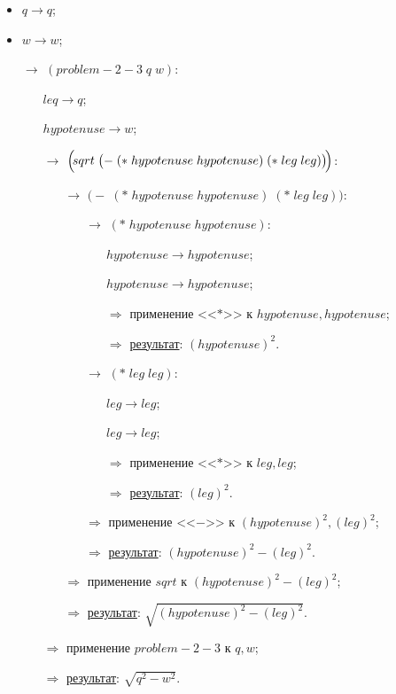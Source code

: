 \begin{itemize}
	\item $q \to q$;
	\item $w \to w$;
	\item[$\longrightarrow$] $(problem\!-\!2\!-\!3\; q\; w)$:
	\begin{itemize}
		\item[\textbullet] $leq \to q$;
		\item[\textbullet] $hypotenuse \to w$;
		\item[$\longrightarrow$] $\Bigl(\!sqrt\; \bigl(-\; (*\; hypotenuse\; hypotenuse)\; (*\; leg\; leg)\bigr)\!\Bigr)$:
		\begin{itemize}
			\item[$\longrightarrow$] $\bigl(-\; (*\; hypotenuse\; hypotenuse)\; (*\; leg\; leg)\bigr)$:
			\begin{itemize}
				\item[$\longrightarrow$] $(*\; hypotenuse\; hypotenuse)$:
				\begin{enumerate}
					\item[\textbullet] $hypotenuse \to hypotenuse$;
					\item[\textbullet] $hypotenuse \to hypotenuse$;
					\item[$\Longrightarrow$] применение <<$*$>> к $hypotenuse, hypotenuse$;
					\item[$\Longrightarrow$] \underline{результат}: $(hypotenuse)^2$.
				\end{enumerate}
				\item[$\longrightarrow$] $(*\; leg\; leg)$:
				\begin{enumerate}
					\item[\textbullet] $leg \to leg$;
					\item[\textbullet] $leg \to leg$;
					\item[$\Longrightarrow$] применение <<$*$>> к $leg, leg$;
					\item[$\Longrightarrow$] \underline{результат}: $(leg)^2$.
				\end{enumerate}
				\item[$\Longrightarrow$] применение <<$-$>> к $(hypotenuse)^2, (leg)^2$;
				\item[$\Longrightarrow$] \underline{результат}: $(hypotenuse)^2 - (leg)^2$.
			\end{itemize}
			\item[$\Longrightarrow$] применение $sqrt$ к $(hypotenuse)^2 - (leg)^2$;
			\item[$\Longrightarrow$] \underline{результат}: $\sqrt{(hypotenuse)^2 - (leg)^2}$.
		\end{itemize}
		\item[$\Longrightarrow$] применение $problem\!-\!2\!-\!3$ к $q, w$;
		\item[$\Longrightarrow$] \underline{результат}: $\sqrt{q^2 - w^2}$.
	\end{itemize}
\end{itemize}


